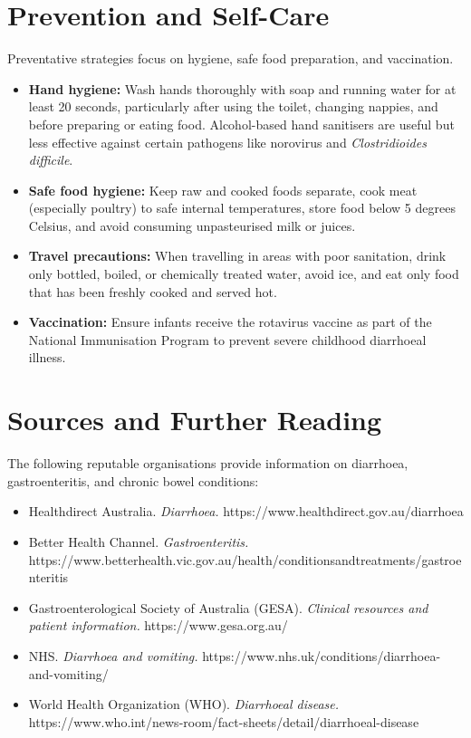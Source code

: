 \section*{Prevention and Self-Care}
Preventative strategies focus on hygiene, safe food preparation, and vaccination.
\begin{itemize}
    \item \textbf{Hand hygiene:} Wash hands thoroughly with soap and running water for at least 20 seconds, particularly after using the toilet, changing nappies, and before preparing or eating food. Alcohol-based hand sanitisers are useful but less effective against certain pathogens like norovirus and \textit{Clostridioides difficile}.
    \item \textbf{Safe food hygiene:} Keep raw and cooked foods separate, cook meat (especially poultry) to safe internal temperatures, store food below 5 degrees Celsius, and avoid consuming unpasteurised milk or juices.
    \item \textbf{Travel precautions:} When travelling in areas with poor sanitation, drink only bottled, boiled, or chemically treated water, avoid ice, and eat only food that has been freshly cooked and served hot.
    \item \textbf{Vaccination:} Ensure infants receive the rotavirus vaccine as part of the National Immunisation Program to prevent severe childhood diarrhoeal illness.
\end{itemize}

\section*{Sources and Further Reading}
The following reputable organisations provide information on diarrhoea, gastroenteritis, and chronic bowel conditions:
\begin{itemize}
    \item Healthdirect Australia. \textit{Diarrhoea.} https://www.healthdirect.gov.au/diarrhoea
    \item Better Health Channel. \textit{Gastroenteritis.} https://www.betterhealth.vic.gov.au/health/conditionsandtreatments/gastroenteritis
    \item Gastroenterological Society of Australia (GESA). \textit{Clinical resources and patient information.} https://www.gesa.org.au/
    \item NHS. \textit{Diarrhoea and vomiting.} https://www.nhs.uk/conditions/diarrhoea-and-vomiting/
    \item World Health Organization (WHO). \textit{Diarrhoeal disease.} https://www.who.int/news-room/fact-sheets/detail/diarrhoeal-disease
\end{itemize}
